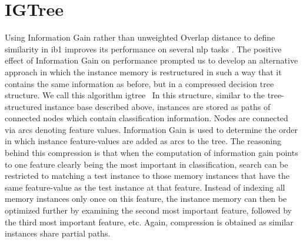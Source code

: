 \documentclass{report}
\begin{document}
\section{IGTree}
\label{igtree}

Using Information Gain rather than unweighted Overlap distance to
define similarity in {\sc ib1} improves its performance on several
{\sc nlp} tasks \cite{Daelemans+92b,VandenBosch+93,VandenBosch97}.
The positive effect of Information Gain on performance prompted us to
develop an alternative approach in which the instance memory is
restructured in such a way that it contains the same information as
before, but in a compressed decision tree structure. We call this
algorithm {\sc igtree}~\cite{Daelemans+97} 
In this structure, similar to the
tree-structured instance base described above, instances are stored as
paths of connected nodes which contain classification
information. Nodes are connected via arcs denoting feature
values. Information Gain is used to determine the order in which
instance feature-values are added as arcs to the tree. The reasoning
behind this compression is that when the computation of information
gain points to one feature clearly being the most important in
classification, search can be restricted to matching a test instance
to those memory instances that have the same feature-value as the test
instance at that feature. Instead of indexing all memory instances
only once on this feature, the instance memory can then be optimized
further by examining the second most important feature, followed by
the third most important feature, etc.  Again, compression is obtained
as similar instances share partial paths.

\end{document}
